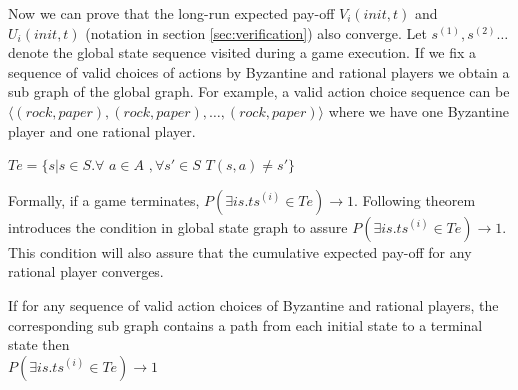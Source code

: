    
 Now we can prove that the long-run expected pay-off $V_i(init,t)$ and $U_i(init,t)$ (notation in section \ref{sec:verification}) also converge. 
 Let $s^(1),s^(2) \dots$ denote the global state sequence visited during a game execution. If we fix a sequence of valid choices of actions by Byzantine and rational players we obtain a sub graph of the global graph. For example, a valid action choice sequence can be $\langle (rock,paper),(rock,paper),\dots, (rock,paper) \rangle$ where we have one Byzantine player and one rational player.
 
 \begin{defn}
 $Te=\{s | s \in S . \forall$  $a \in A$  $, \forall s' \in S$ $ T(s,a) \neq s' \}$
 \end{defn}
 
 Formally, if a game terminates, $P(\exists i s.t s^(i) \in Te) \rightarrow 1$. Following theorem introduces the condition in global state graph to assure $P(\exists i s.t s^(i) \in Te) \rightarrow 1$. This condition will also assure that the cumulative expected pay-off for any rational player converges.  \\


\begin{theorem}\label{thm:reach}
If for any sequence of valid action choices of Byzantine and rational players,  the corresponding sub graph contains a path from each initial state to a terminal state then  \\
	$P(\exists i s.t s^(i) \in Te) \rightarrow 1$
\end{theorem}



